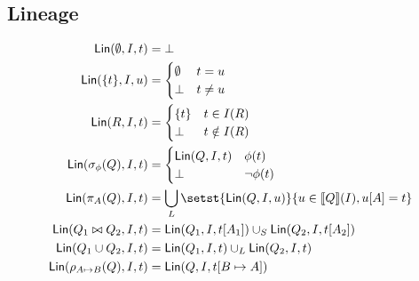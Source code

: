 \subsection{Lineage}
\begin{align*}
  \Lineage(\emptyset, I, t) &= \bot \\
  \Lineage(\set{t}, I, u) &= \begin{cases}
    \emptyset & t = u \\
    \bot & t \neq u
  \end{cases} \\
  \Lineage(R, I, t) &= \begin{cases}
    \set{t} & t \in I(R) \\
    \bot & t \notin I(R)
  \end{cases} \\
  \Lineage(\select_\phi(Q), I, t) &= \begin{cases}
    \Lineage(Q, I, t) & \phi(t) \\
    \bot & \lnot \phi(t)
  \end{cases} \\
  \Lineage(\project_A(Q), I, t) &= \bigcup_L \setst{\Lineage(Q, I, u)}{u \in \denote{Q}(I), u[A] = t} \\
  \Lineage(Q_1 \join Q_2, I, t) &= \Lineage(Q_1, I, t[A_1]) \cup_S \Lineage(Q_2, I, t[A_2]) \\
  \Lineage(Q_1 \cup Q_2, I, t) &= \Lineage(Q_1, I, t) \cup_L \Lineage(Q_2, I, t) \\
  \Lineage(\rename_{A \mapsto B}(Q), I, t) &= \Lineage(Q, I, t[B \mapsto A])
\end{align*}

